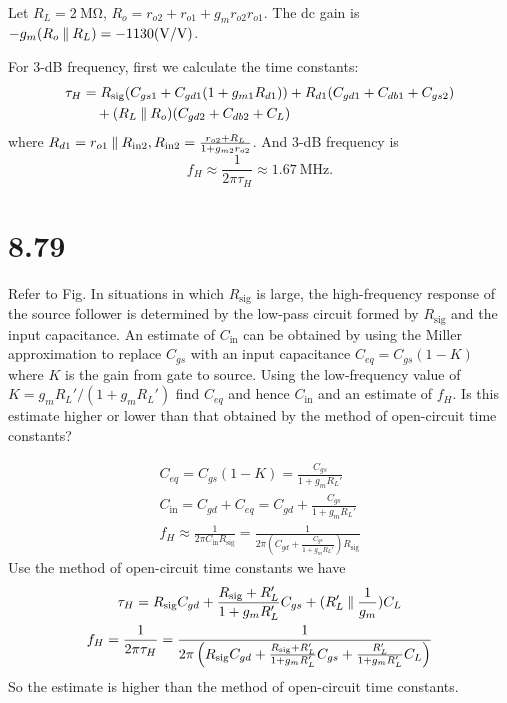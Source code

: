 \documentclass[12pt, a4paper]{article}
\begin{document}
\Ans \\
Let $R_L = \SI{2}{\Mohm}$, $R_o = r_{o2} + r_{o1} + g_mr_{o2}r_{o1}$.
The dc gain is $-g_m (R_o \paral R_L) = -1130 (\si{\V/\V})$.

For 3-dB frequency, first we calculate the time constants:
\begin{align*}
  \tau_{H} &= R_\text{sig} (C_{gs1} + C_{gd1}(1+g_{m1}R_{d1}))
  + R_{d1}(C_{gd1} + C_{db1} + C_{gs2}) \\
  & \quad + (R_L \mathbin{\|} R_o) (C_{gd2} + C_{db2} + C_L)
\end{align*}
where $R_{d1} = r_{o1} \mathbin{\|} R_\text{in2}, R_\text{in2} =
\frac{r_{o2}+R_L}{1+g_{m2}r_{o2}}$.
And 3-dB frequency is
\[
  f_H \approx \frac{1}{2\pi \tau_H} \approx \SI{1.67}{\MHz}.
\]

\section{8.79}
Refer to Fig. In situations in which $R_{\text{sig}}$ is large, the
high-frequency response of the source follower is determined by the low-pass
circuit formed by $R_{\text{sig}}$ and the input capacitance. An estimate
of $C_{\text{in}}$ can be obtained by using the Miller approximation to
replace $C_{gs}$ with an input capacitance $C_{eq} = C_{gs}(1-K)$ where $K$
is the gain from gate to source. Using the low-frequency value of
$K = g_mR_L'/(1+g_mR_L')$ find $C_{eq}$ and hence $C_{\text{in}}$ and an
estimate of $f_H$. Is this estimate higher or lower than that obtained by the
method of open-circuit time constants?

\Ans
\begin{gather*}
  C_{eq} = C_{gs}(1-K) = \frac{C_{gs}}{1+g_mR_L'} \\
  C_\text{in} = C_{gd} + C_{eq} = C_{gd} + \frac{C_{gs}}{1+g_mR_L'} \\
  f_H \approx \frac{1}{2\pi C_\text{in}R_\text{sig}}
  = \frac{1}{2\pi \left(C_{gd}+\frac{C_{gs}}{1+g_mR_L'}\right) R_\text{sig}}
\end{gather*}
Use the method of open-circuit time constants we have
\begin{gather*}
  \tau_H = R_\text{sig}C_{gd} + \frac{R_\text{sig}+R_L'}{1+g_mR_L'}C_{gs}
  + (R_L' \mathbin{\|} \frac{1}{g_m})C_L \\
  f_H = \frac{1}{2\pi \tau_H}
  = \frac{1}{2\pi \left(R_\text{sig}C_{gd} +
    \frac{R_\text{sig}+R_L'}{1+g_mR_L'}C_{gs} +
   \frac{R_L'}{1+g_mR_L'}C_L\right)}
\end{gather*}
So the estimate is higher than the method of open-circuit time constants.
\end{document}
